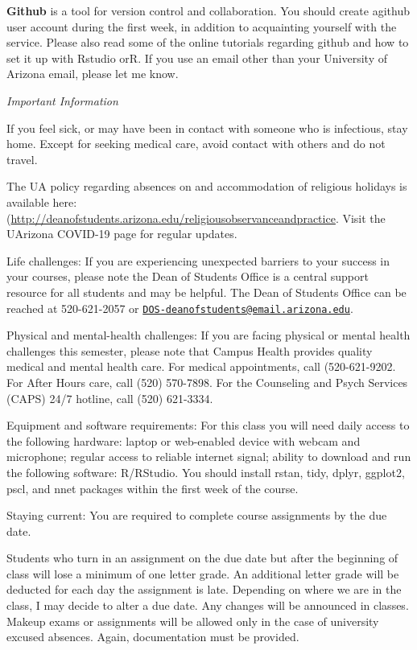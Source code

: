 \documentclass[
]{book}
\begin{document}
\textbf{Github} is a tool for version control and collaboration. You should create agithub user account during the first week, in addition to acquainting yourself with the service. Please also read some of the online tutorials regarding github and how to set it up with Rstudio orR. If you use an email other than your University of Arizona email, please let me know.

\emph{Important Information }

If you feel sick, or may have been in contact with someone who is infectious, stay home. Except for seeking medical care, avoid contact with others and do not travel.

The UA policy regarding absences on and accommodation of religious holidays is available here: (\url{http://deanofstudents.arizona.edu/religiousobservanceandpractice}. Visit the UArizona COVID-19 page for regular updates.

Life challenges: If you are experiencing unexpected barriers to your success in your courses, please note the Dean of Students Office is a central support resource for all students and may be helpful. The Dean of Students Office can be reached at 520-621-2057 or \href{mailto:DOS-deanofstudents@email.arizona.edu}{\nolinkurl{DOS-deanofstudents@email.arizona.edu}}.

Physical and mental-health challenges: If you are facing physical or mental health challenges this semester, please note that Campus Health provides quality medical and mental health care. For medical appointments, call (520-621-9202. For After Hours care, call (520) 570-7898. For the Counseling and Psych Services (CAPS) 24/7 hotline, call (520) 621-3334.

Equipment and software requirements: For this class you will need daily access to the following hardware: laptop or web-enabled device with webcam and microphone; regular access to reliable internet signal; ability to download and run the following software: R/RStudio. You should install rstan, tidy, dplyr, ggplot2, pscl, and nnet packages within the first week of the course.

Staying current: You are required to complete course assignments by the due date.

Students who turn in an assignment on the due date but after the beginning of class will lose a minimum of one letter grade. An additional letter grade will be deducted for each day the assignment is late. Depending on where we are in the class, I may decide to alter a due date. Any changes will be announced in classes. Makeup exams or assignments will be allowed only in the case of university excused absences. Again, documentation must be provided.
\end{document}
